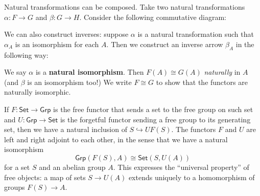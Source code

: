 Natural transformations can be composed. Take two natural transformations $\alpha \colon F \to G$ and $\beta \colon G \to H$. Consider the following commutative diagram: 
            \begin{figure}[H]
                \centering
            \end{figure}
    We can also construct inverses: suppose $\alpha$ is a natural transformation such that $\alpha_A$ is an isomorphism for each $A$. Then we construct an inverse arrow $\beta_A$ in the following way:
            \begin{figure}[H]
                \centering
            \end{figure}
            We say $\alpha$ is a \textbf{natural isomorphism}. Then $F(A)\cong G(A)$ \emph{naturally} in $A$ (and $\beta$ is an isomorphism too!) We write $F\cong G$ to show that the functors are naturally isomorphic.
\begin{example}
    If $F \colon \mathsf{Set} \to \mathsf{Grp}$ is the free functor that sends a set to the free group on such set and $U \colon \mathsf{Grp} \to \mathsf{Set}$ is the forgetful functor sending a free group to its generating set, then we have a natural inclusion of $S\hookrightarrow UF(S)$. The functors $F$ and $U$ are left and right adjoint to each other, in the sense that we have a natural isomorphism \[
        \mathsf{Grp}(F(S),A)\cong \mathsf{Set}(S,U(A))
    \] for a set $S$ and an abelian group $A$. This expresses the ``universal property'' of free objects: a map of sets $S\to U(A)$ extends uniquely to a homomorphism of groups $F(S)\to A$. 
\end{example}

